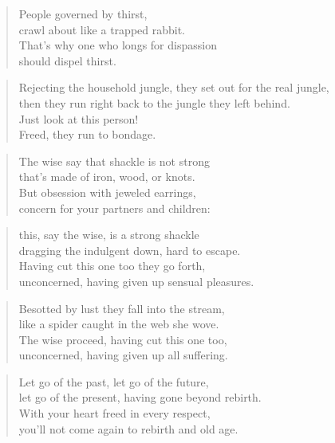 \documentclass[12pt,openany]{book}%
\begin{document}
\begin{verse}%
People governed by thirst, \\
crawl about like a trapped rabbit. \\
That’s why one who longs for dispassion \\
should dispel thirst. 

%
\end{verse}

\begin{verse}%
Rejecting the household jungle, they set out for the real jungle, \\
then they run right back to the jungle they left behind. \\
Just look at this person! \\
Freed, they run to bondage. 

%
\end{verse}

\begin{verse}%
The wise say that shackle is not strong \\
that’s made of iron, wood, or knots. \\
But obsession with jeweled earrings, \\
concern for your partners and children: 

%
\end{verse}

\begin{verse}%
this, say the wise, is a strong shackle \\
dragging the indulgent down, hard to escape. \\
Having cut this one too they go forth, \\
unconcerned, having given up sensual pleasures. 

%
\end{verse}

\begin{verse}%
Besotted by lust they fall into the stream, \\
like a spider caught in the web she wove. \\
The wise proceed, having cut this one too, \\
unconcerned, having given up all suffering. 

%
\end{verse}

\begin{verse}%
Let go of the past, let go of the future, \\
let go of the present, having gone beyond rebirth. \\
With your heart freed in every respect, \\
you’ll not come again to rebirth and old age. 

%
\end{verse}
\end{document}
